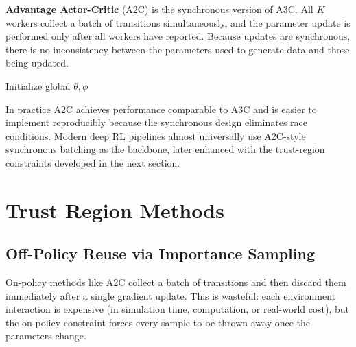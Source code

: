 \textbf{Advantage Actor-Critic} (A2C) is the synchronous version
of A3C.  All $K$ workers collect a batch of transitions simultaneously, and
the parameter update is performed only after all workers have reported.
Because updates are synchronous, there is no inconsistency between the
parameters used to generate data and those being updated.

\begin{algorithm}[ht]
\caption{Advantage Actor-Critic (A2C)}
\label{alg:a2c}
\DontPrintSemicolon
{}
Initialize global $\theta, \phi$\;
\end{algorithm}

In practice A2C achieves performance comparable to A3C and is easier to
implement reproducibly because the synchronous design eliminates race
conditions.  Modern deep RL pipelines almost universally use A2C-style
synchronous batching as the backbone, later enhanced with the trust-region
constraints developed in the next section.

\section{Trust Region Methods}
\label{sec:trpo}

\subsection{Off-Policy Reuse via Importance Sampling}

On-policy methods like A2C collect a batch of transitions and then discard
them immediately after a single gradient update.  This is wasteful: each
environment interaction is expensive (in simulation time, computation, or
real-world cost), but the on-policy constraint forces every sample to be
thrown away once the parameters change.

